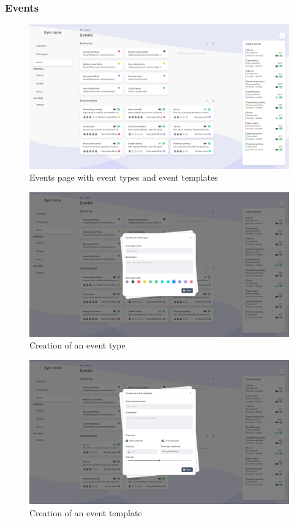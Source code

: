 \documentclass[a4paper, 12pt, oneside]{book}
\begin{document}
\subsubsection{Events}
\begin{figure}[H]
	\centering
	\includegraphics[width=\textwidth]{assets/core-screenshots/events.png}
	\caption{Events page with event types and event templates}
\end{figure}
\begin{figure}[H]
	\centering
	\includegraphics[width=\textwidth]{assets/core-screenshots/create-event-type.png}
	\caption{Creation of an event type}
\end{figure}
\begin{figure}[H]
	\centering
	\includegraphics[width=\textwidth]{assets/core-screenshots/create-event-template.png}
	\caption{Creation of an event template}
\end{figure}
\end{document}
